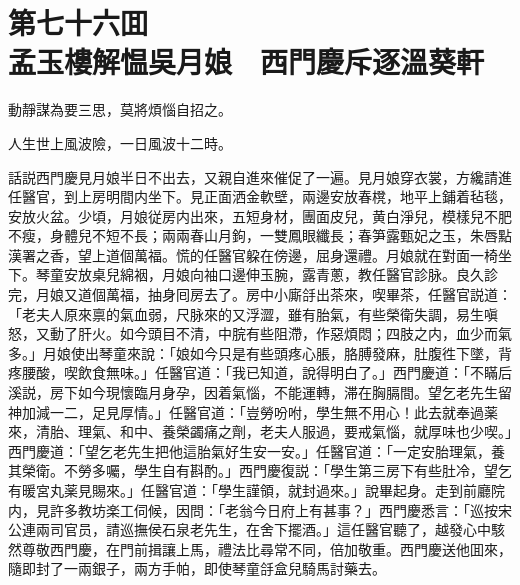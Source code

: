 
\chapter*{第七十六囬　\\孟玉樓解愠吳月娘　西門慶斥逐溫葵軒}


\begin{myquote}
動靜謀為要三思，莫將煩惱自招之。

人生世上風波險，一日風波十二時。
\end{myquote}

話説西門慶見月娘半日不出去，又親自進來催促了一遍。見月娘穿衣裳，方纔請進任醫官，到上房明間内坐下。見正面洒金軟壁，兩邊安放春櫈，地平上鋪着毡毯，安放火盆。少頃，月娘従房内出來，五短身材，團面皮兒，黄白淨兒，模樣兒不肥不瘦，身體兒不短不長；兩兩春山月鉤，一雙鳳眼纖長；春笋露甄妃之玉，朱唇點漢署之香，望上道個萬福。慌的任醫官躱在傍邊，屈身還禮。月娘就在對面一椅坐下。琴童安放桌兒綿裀，月娘向袖口邊伸玉腕，露青蔥，教任醫官診脉。良久診完，月娘又道個萬福，抽身囘房去了。房中小廝㧱出茶來，喫畢茶，任醫官説道：「老夫人原來禀的氣血弱，尺脉來的又浮澀，雖有胎氣，有些榮衛失調，易生嗔怒，又動了肝火。如今頭目不清，中脘有些阻滯，作惡煩悶；四肢之内，血少而氣多。」月娘使出琴童來說：「娘如今只是有些頭疼心脹，胳膊發麻，肚腹徃下墜，背疼腰酸，喫飲食無味。」任醫官道：「我已知道，說得明白了。」西門慶道：「不瞞后溪説，房下如今現懷臨月身孕，因着氣惱，不能運轉，滞在胸膈間。望乞老先生留神加減一二，足見厚情。」任醫官道：「豈勞吩咐，學生無不用心！此去就奉過薬來，清胎、理氣、和中、養榮蠲痛之劑，老夫人服過，要戒氣惱，就厚味也少喫。」西門慶道：「望乞老先生把他這胎氣好生安一安。」任醫官道：「一定安胎理氣，養其榮衛。不勞多囑，學生自有斟酌。」西門慶復説：「學生第三房下有些肚冷，望乞有暖宮丸薬見賜來。」任醫官道：「學生謹領，就封過來。」說畢起身。走到前廳院内，見許多教坊楽工伺候，因問：「老翁今日府上有甚事？」西門慶悉言：「巡按宋公連兩司官员，請巡撫侯石泉老先生，在舍下擺酒。」這任醫官聽了，越發心中駭然尊敬西門慶，在門前揖讓上馬，禮法比尋常不同，倍加敬重。西門慶送他囬來，隨即封了一兩銀子，兩方手帕，即使琴童㧱盒兒騎馬討藥去。

